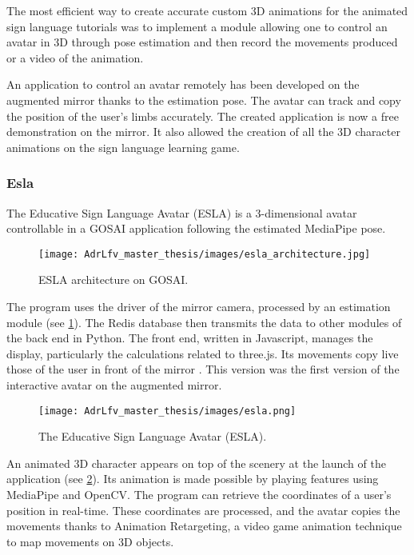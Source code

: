 The most efficient way to create accurate custom 3D animations for the animated sign language tutorials was to implement a module allowing one to control an avatar in 3D through pose estimation and then record the movements produced or a video of the animation.

An application to control an avatar remotely has been developed on the augmented mirror thanks to the estimation pose. The avatar can track and copy the position of the user's limbs accurately. The created application is now a free demonstration on the mirror. It also allowed the creation of all the 3D character animations on the sign language learning game.

\subsubsection{Esla}

The Educative Sign Language Avatar (ESLA) is a 3-dimensional avatar controllable in a GOSAI application following the estimated MediaPipe pose. 

\begin{figure}[h]
    \centering
    \texttt{[image: AdrLfv\_master\_thesis/images/esla\_architecture.jpg]}
    \caption{ESLA architecture on GOSAI.}
    \label{fig:esla_architecture}
\end{figure}

The program uses the driver of the mirror camera, processed by an estimation module (see \ref{fig:esla_architecture}). The Redis database then transmits the data to other modules of the back end in Python. The front end, written in Javascript, manages the display, particularly the calculations related to three.js. Its movements copy live those of the user in front of the mirror \cite{esla}. This version was the first version of the interactive avatar on the augmented mirror.


\begin{figure}[h]
    \centering
    \texttt{[image: AdrLfv\_master\_thesis/images/esla.png]}
    \caption{The Educative Sign Language Avatar (ESLA).}
    \label{fig:esla}
\end{figure}


An animated 3D character appears on top of the scenery at the launch of the application (see \ref{fig:esla}). Its animation is made possible by playing features using MediaPipe and OpenCV. The program can retrieve the coordinates of a user's position in real-time. These coordinates are processed, and the avatar copies the movements thanks to Animation Retargeting, a video game animation technique to map movements on 3D objects.

